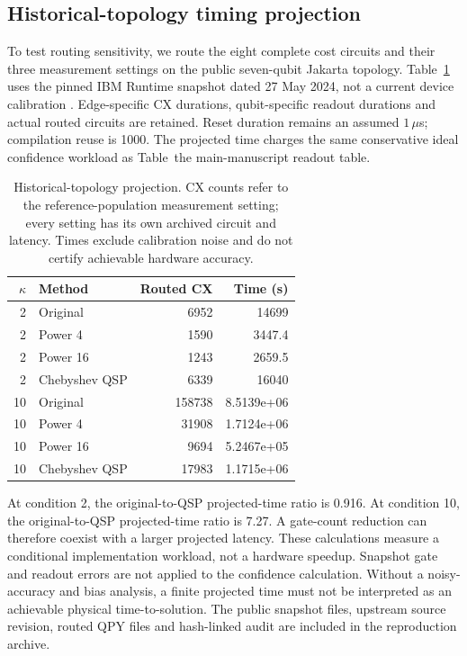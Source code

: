 \documentclass[10pt]{article}
\begin{document}
\subsection{Historical-topology timing projection}
To test routing sensitivity, we route the eight complete cost circuits and their three measurement settings on the public seven-qubit Jakarta topology. Table~\ref{tab:chebrouted} uses the pinned IBM Runtime snapshot dated 27 May 2024, not a current device calibration \cite{jakarta}. Edge-specific CX durations, qubit-specific readout durations and actual routed circuits are retained. Reset duration remains an assumed $1\,\mu$s; compilation reuse is 1000. The projected time charges the same conservative ideal confidence workload as Table~the main-manuscript readout table.
\begin{table}[!tbp]\centering\small\caption{Historical-topology projection. CX counts refer to the reference-population measurement setting; every setting has its own archived circuit and latency. Times exclude calibration noise and do not certify achievable hardware accuracy.}\label{tab:chebrouted}
\begin{tabular}{rlrr}\toprule
$\kappa$ & Method & Routed CX & Time (s)\\\midrule
2 & Original & 6952 & 14699\\
2 & Power 4 & 1590 & 3447.4\\
2 & Power 16 & 1243 & 2659.5\\
2 & Chebyshev QSP & 6339 & 16040\\
10 & Original & 158738 & 8.5139e+06\\
10 & Power 4 & 31908 & 1.7124e+06\\
10 & Power 16 & 9694 & 5.2467e+05\\
10 & Chebyshev QSP & 17983 & 1.1715e+06\\
\bottomrule\end{tabular}

\end{table}
At condition 2, the original-to-QSP projected-time ratio is 0.916. At condition 10, the original-to-QSP projected-time ratio is 7.27. A gate-count reduction can therefore coexist with a larger projected latency. These calculations measure a conditional implementation workload, not a hardware speedup. Snapshot gate and readout errors are not applied to the confidence calculation. Without a noisy-accuracy and bias analysis, a finite projected time must not be interpreted as an achievable physical time-to-solution. The public snapshot files, upstream source revision, routed QPY files and hash-linked audit are included in the reproduction archive.
\end{document}
